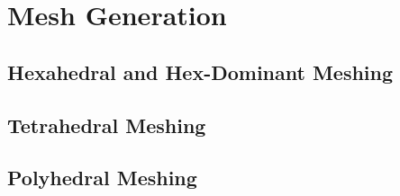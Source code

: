 \chapter{Mesh Generation}
%

\section{Hexahedral and Hex-Dominant Meshing}
\label{Hexahedral and Hex-Dominant Meshing}

\section{Tetrahedral Meshing}
\label{Tetrahedral Meshing}

\section{Polyhedral Meshing}
\label{Polyhedral Meshing}


